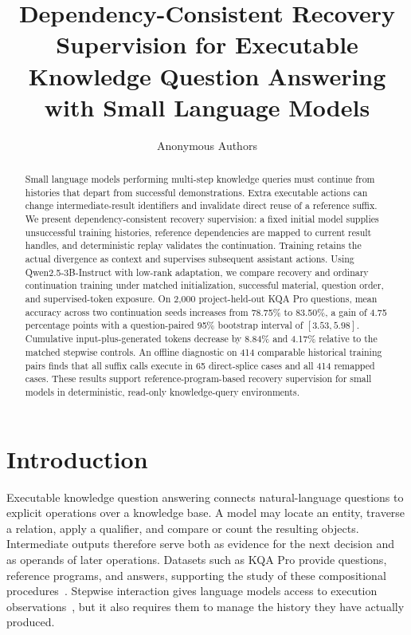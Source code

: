 \documentclass[runningheads]{llncs}
\begin{document}
\title{Dependency-Consistent Recovery Supervision for Executable Knowledge Question Answering with Small Language Models}
\author{Anonymous Authors}
\institute{}
\maketitle
\begin{abstract}
Small language models performing multi-step knowledge queries must continue from histories that depart from successful demonstrations. Extra executable actions can change intermediate-result identifiers and invalidate direct reuse of a reference suffix. We present dependency-consistent recovery supervision: a fixed initial model supplies unsuccessful training histories, reference dependencies are mapped to current result handles, and deterministic replay validates the continuation. Training retains the actual divergence as context and supervises subsequent assistant actions. Using Qwen2.5-3B-Instruct with low-rank adaptation, we compare recovery and ordinary continuation training under matched initialization, successful material, question order, and supervised-token exposure. On 2,000 project-held-out KQA Pro questions, mean accuracy across two continuation seeds increases from 78.75\% to 83.50\%, a gain of 4.75 percentage points with a question-paired 95\% bootstrap interval of $[3.53,5.98]$. Cumulative input-plus-generated tokens decrease by 8.84\% and 4.17\% relative to the matched stepwise controls. An offline diagnostic on 414 comparable historical training pairs finds that all suffix calls execute in 65 direct-splice cases and all 414 remapped cases. These results support reference-program-based recovery supervision for small models in deterministic, read-only knowledge-query environments.
\end{abstract}

\section{Introduction}

Executable knowledge question answering connects natural-language questions to explicit operations over a knowledge base. A model may locate an entity, traverse a relation, apply a qualifier, and compare or count the resulting objects. Intermediate outputs therefore serve both as evidence for the next decision and as operands of later operations. Datasets such as KQA Pro provide questions, reference programs, and answers, supporting the study of these compositional procedures~\cite{cao2022kqapro}. Stepwise interaction gives language models access to execution observations~\cite{yao2023react}, but it also requires them to manage the history they have actually produced.
\end{document}
